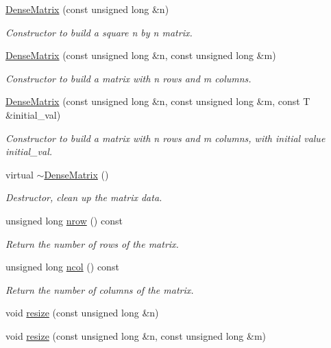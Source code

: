 \begin{DoxyCompactItemize}
\hyperlink{classoomph_1_1DenseMatrix_a2291404def276dcee1a6099d054d44d6}{Dense\+Matrix} (const unsigned long \&n)
\begin{DoxyCompactList}\small\item\em Constructor to build a square n by n matrix. \end{DoxyCompactList}\item 
\hyperlink{classoomph_1_1DenseMatrix_a5afcfd56a9720541e67a6e8d002016d4}{Dense\+Matrix} (const unsigned long \&n, const unsigned long \&m)
\begin{DoxyCompactList}\small\item\em Constructor to build a matrix with n rows and m columns. \end{DoxyCompactList}\item 
\hyperlink{classoomph_1_1DenseMatrix_a7b599610bd78a7818b2e4d0835b27e3a}{Dense\+Matrix} (const unsigned long \&n, const unsigned long \&m, const T \&initial\+\_\+val)
\begin{DoxyCompactList}\small\item\em Constructor to build a matrix with n rows and m columns, with initial value initial\+\_\+val. \end{DoxyCompactList}\item 
virtual \hyperlink{classoomph_1_1DenseMatrix_a673e04c72174ec084e56ad5f53ba51da}{$\sim$\+Dense\+Matrix} ()
\begin{DoxyCompactList}\small\item\em Destructor, clean up the matrix data. \end{DoxyCompactList}\item 
unsigned long \hyperlink{classoomph_1_1DenseMatrix_a1b425094510d833ffe91920747a0a962}{nrow} () const
\begin{DoxyCompactList}\small\item\em Return the number of rows of the matrix. \end{DoxyCompactList}\item 
unsigned long \hyperlink{classoomph_1_1DenseMatrix_a9937181f1cb4cfaed7aaf3b483c42456}{ncol} () const
\begin{DoxyCompactList}\small\item\em Return the number of columns of the matrix. \end{DoxyCompactList}\item 
void \hyperlink{classoomph_1_1DenseMatrix_adec1ef741b1c5048a12ba9a540c2719c}{resize} (const unsigned long \&n)
\item 
void \hyperlink{classoomph_1_1DenseMatrix_a0f01dd97b1c71868371f93259efc26b0}{resize} (const unsigned long \&n, const unsigned long \&m)

\end{DoxyCompactItemize}
